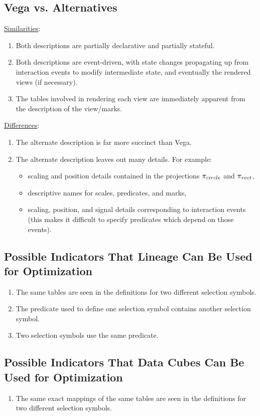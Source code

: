 \documentclass[fleqn,reprint]{sigplanconf}
\begin{document}
\subsection{Vega vs. Alternatives}
\underline{Similarities}:
\begin{enumerate}
	\item Both descriptions are partially declarative and partially stateful.
	\item Both descriptions are event-driven, with state changes propagating up from interaction events to modify intermediate state, and eventually the rendered views (if necessary).
	\item The tables involved in rendering each view are immediately apparent from the description of the view/marks.
\end{enumerate}
\underline{Differences}:
\begin{enumerate}
	\item The alternate description is far more succinct than Vega.
	\item The alternate description leaves out many details.
		For example:
		\begin{itemize}
			\item scaling and position details contained in the projections $\mathlarger{\pi}_{circle}$ and $\mathlarger{\pi}_{rect}$,
			\item descriptive names for scales, predicates, and marks,
			\item scaling, position, and signal details corresponding to interaction events (this makes it difficult to specify predicates which depend on those events).
		\end{itemize}
\end{enumerate}
\subsection{Possible Indicators That Lineage Can Be Used for Optimization}
\begin{enumerate}
	\item The same tables are seen in the definitions for two different selection symbols.
	\item The predicate used to define one selection symbol contains another selection symbol.
	\item Two selection symbols use the same predicate.
\end{enumerate}
\subsection{Possible Indicators That Data Cubes Can Be Used for Optimization}
\begin{enumerate}
	\item The same exact mappings of the same tables are seen in the definitions for two different selection symbols.
\end{enumerate}



\end{document}
